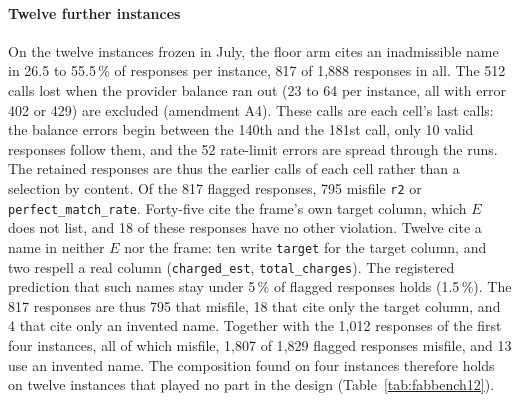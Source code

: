 \documentclass[smallextended,natbib]{svjour3}
\begin{document}
\paragraph{Twelve further instances}
On the twelve instances frozen in July, the floor arm cites an inadmissible
name in 26.5 to 55.5\,\% of responses per instance, 817 of 1{,}888 responses
in all. The 512 calls lost when the provider balance ran out (23 to 64 per
instance, all with error 402 or 429) are excluded (amendment A4). These calls
are each cell's last calls: the balance errors begin between the 140th and
the 181st call, only 10 valid responses follow them, and the 52 rate-limit
errors are spread through the runs. The retained responses are thus the
earlier calls of each cell rather than a selection by content. Of the 817
flagged responses, 795 misfile \texttt{r2} or \texttt{perfect\_match\_rate}.
Forty-five cite the frame's own target column, which $E$ does not list, and 18
of these responses have no other violation. Twelve cite a name in neither $E$
nor the frame: ten write \texttt{target} for the target column, and two
respell a real column (\texttt{charged\_est}, \texttt{total\_charges}). The
registered prediction that such names stay under 5\,\% of flagged responses
holds (1.5\,\%). The 817 responses are thus 795 that misfile, 18 that cite
only the target column, and 4 that cite only an invented name. Together with
the 1{,}012 responses of the first four instances, all of which misfile,
1{,}807 of 1{,}829 flagged responses misfile, and 13 use an invented name. The
composition found on four instances therefore holds on twelve instances that played no part in the design
(Table~\ref{tab:fabbench12}).
\end{document}
